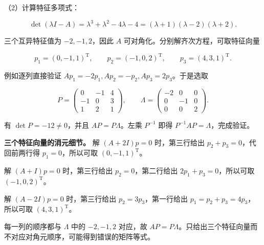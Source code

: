 \documentclass[UTF8,11pt,fontset=windows]{ctexart}
\begin{document}
（2）计算特征多项式：

$$
\det(\lambda I-A)=\lambda^3+\lambda^2-4\lambda-4
=(\lambda+1)(\lambda-2)(\lambda+2).
$$

三个互异特征值为 $-2,-1,2$，因此 $A$ 可对角化。分别解齐次方程，可取特征向量

$$
p_1=(0,-1,1)^{\mathrm T},\qquad p_2=(-1,0,2)^{\mathrm T},\qquad
p_3=(4,3,1)^{\mathrm T}.
$$

例如逐列直接验证 $Ap_1=-2p_1,Ap_2=-p_2,Ap_3=2p_3$。于是选取

$$
P=\begin{pmatrix}0&-1&4\\-1&0&3\\1&2&1\end{pmatrix},\qquad
\Lambda=\begin{pmatrix}-2&0&0\\0&-1&0\\0&0&2\end{pmatrix}.
$$

有 $\det P=-12\ne0$，并且 $AP=P\Lambda$。左乘 $P^{-1}$ 即得 $P^{-1}AP=\Lambda$，完成验证。

\textbf{三个特征向量的消元细节。} 解 $(A+2I)p=0$ 时，第三行给出 $p_2+p_3=0$，代回前两行得 $p_1=0$，所以可取 $(0,-1,1)^{\mathrm T}$。

解 $(A+I)p=0$ 时，第三行给出 $p_2=0$，第二行给出 $2p_1+p_3=0$，所以可取 $(-1,0,2)^{\mathrm T}$。

解 $(A-2I)p=0$ 时，第三行给出 $p_2=3p_3$，第一行给出 $p_1=p_2+p_3=4p_3$，所以可取 $(4,3,1)^{\mathrm T}$。

每一列的顺序都与 $\Lambda$ 中的 $-2,-1,2$ 对应，故 $AP=P\Lambda$。只给出三个特征向量而不对应对角元顺序，可能得到错误的矩阵等式。
\end{document}
